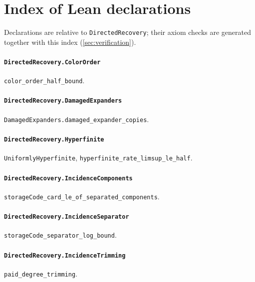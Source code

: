 \section{Index of Lean declarations}\label{sec:leanindex}

Declarations are relative to \texttt{DirectedRecovery}; their axiom checks are generated together with this index (\cref{sec:verification}).

\paragraph{\texttt{DirectedRecovery.ColorOrder}}
{\small\raggedright \texttt{color\_order\_half\_bound}.\par}

\paragraph{\texttt{DirectedRecovery.DamagedExpanders}}
{\small\raggedright \texttt{DamagedExpanders.damaged\_expander\_copies}.\par}

\paragraph{\texttt{DirectedRecovery.Hyperfinite}}
{\small\raggedright \texttt{UniformlyHyperfinite}, \texttt{hyperfinite\_rate\_limsup\_le\_half}.\par}

\paragraph{\texttt{DirectedRecovery.IncidenceComponents}}
{\small\raggedright \texttt{storageCode\_card\_le\_of\_separated\_components}.\par}

\paragraph{\texttt{DirectedRecovery.IncidenceSeparator}}
{\small\raggedright \texttt{storageCode\_separator\_log\_bound}.\par}

\paragraph{\texttt{DirectedRecovery.IncidenceTrimming}}
{\small\raggedright \texttt{paid\_degree\_trimming}.\par}

